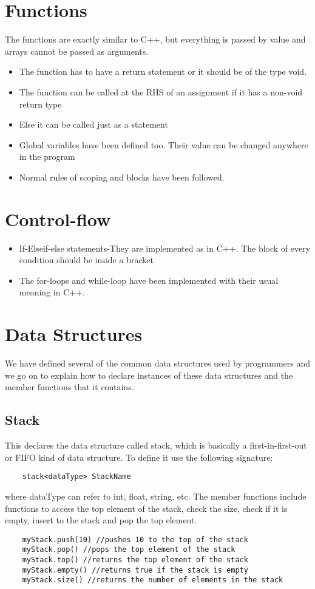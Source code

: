 \documentclass[12pt]{article}
\begin{document}
\section{Functions}
The functions are exactly similar to C++, but everything is passed by value and arrays cannot be passed as arguments.
\begin{itemize}
\item The function has to have a return statement or it should be of the type void.
\item The function can be called at the RHS of an assignment if it has a non-void return type
\item Else it can be called just as a statement
\item Global variables have been defined too. Their value can be changed anywhere in the program
\item Normal rules of scoping and blocks have been followed.
\end{itemize}
\section{Control-flow}
\begin{itemize}
\item If-Elseif-else statements-They are implemented as in C++. The block of every condition should be inside a {} bracket
\item The for-loops and while-loop have been implemented with their usual meaning in C++.
\end{itemize}
\section{Data Structures}
We have defined several of the common data structures used by programmers and we go on to explain how to declare instances of these data structures and the member functions that it contains.
\subsection{Stack}
This declares the data structure called stack, which is basically a first-in-first-out or FIFO kind of data structure. To define it use the following signature:
\begin{verbatim}
    stack<dataType> StackName
\end{verbatim}
where dataType can refer to int, float, string, etc.
The member functions include functions to access the top element of the stack, check the size, check if it is empty, insert to the stack and pop the top element.
\begin{verbatim}
    myStack.push(10) //pushes 10 to the top of the stack
    myStack.pop() //pops the top element of the stack
    myStack.top() //returns the top element of the stack
    myStack.empty() //returns true if the stack is empty
    myStack.size() //returns the number of elements in the stack
\end{verbatim}
\end{document}
